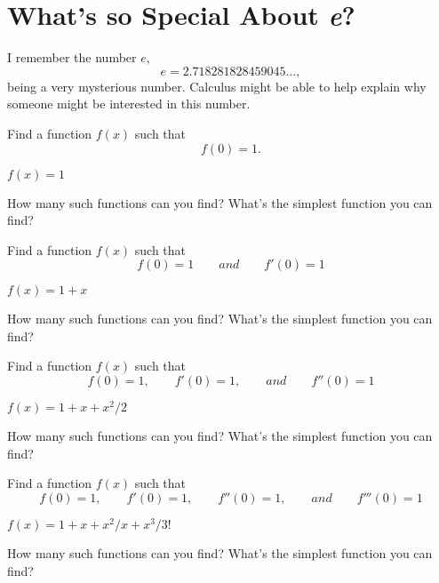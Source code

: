 \documentclass{article}
\begin{document}
\section{What's so Special About \textit{e}?}

I remember the number $e$,
\[
e = 2.718281828459045\dots,
\]
being a very mysterious number. Calculus might be able to help explain
why someone might be interested in this number.

\begin{exercise}
  Find a function $f(x)$ such that
  \[
  f(0) = 1.
  \]
  \begin{answer}
    $f(x) = 1$
  \end{answer}
  \pause
  How many such functions can you find? What's the simplest function you
  can find?
  \begin{answer}
  \end{answer}
\end{exercise}


\begin{exercise}
  Find a function $f(x)$ such that
  \[
  f(0) = 1\qquad and \qquad f'(0) = 1
  \]
  \begin{answer}
    $f(x) = 1+x$
  \end{answer}
  \pause
  How many such functions can you find? What's the simplest function you
  can find?
  \begin{answer}
  \end{answer}
\end{exercise}

\begin{exercise}
Find a function $f(x)$ such that
\[
f(0) = 1,\qquad f'(0) = 1,\qquad and \qquad f''(0) = 1
\]
  \begin{answer}
    $f(x) = 1+x+x^2/2$
  \end{answer}
  \pause
  How many such functions can you find? What's the simplest function you
  can find?
  \begin{answer}
  \end{answer}
\end{exercise}


\begin{exercise}
  Find a function $f(x)$ such that
  \[
  f(0) = 1,\qquad f'(0) = 1,\qquad f''(0) = 1,\qquad and \qquad f'''(0) = 1
  \]
  \begin{answer}
    $f(x) = 1+x+x^2/x + x^3/3!$
  \end{answer}
  \pause
  How many such functions can you find? What's the simplest function you
  can find?
  \begin{answer}
  \end{answer}
\end{exercise}
\end{document}
